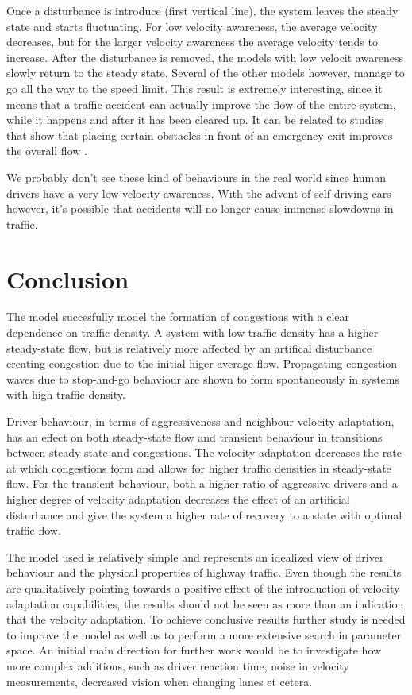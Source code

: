 \documentclass[11pt,a4paper,twocolumn]{article}
\begin{document}
Once a disturbance is introduce (first vertical line), the system leaves the steady state and starts fluctuating. For low velocity awareness, the average velocity decreases, but for the larger velocity awareness the average velocity tends to increase.
After the disturbance is removed, the models with low velocit awareness slowly return to the steady state. Several of the other models however, manage to go all the way to the speed limit.
This result is extremely interesting, since it means that a traffic accident can actually improve the flow of the entire system, while it happens and after it has been cleared up.
It can be related to studies that show that placing certain obstacles in front of an emergency exit improves the overall flow \cite{yanagisawa2009obstacle}.

We probably don't see these kind of behaviours in the real world since human drivers have a very low velocity awareness. With the advent of self driving cars however, it's possible that accidents will no longer cause immense slowdowns in traffic.

\section{Conclusion}
The model succesfully model the formation of congestions with a clear dependence on traffic density. A system with low traffic density has a higher steady-state flow, but is relatively more affected by an artifical disturbance creating congestion due to the initial higer average flow. Propagating congestion waves due to stop-and-go behaviour are shown to form spontaneously in systems with high traffic density. 

Driver behaviour, in terms of aggressiveness and neighbour-velocity adaptation, has an effect on both steady-state flow and transient behaviour in transitions between steady-state and congestions. The velocity adaptation decreases the rate at which congestions form and allows for higher traffic densities in steady-state flow. For the transient behaviour, both a higher ratio of aggressive drivers and a higher degree of velocity adaptation decreases the effect of an artificial disturbance and give the system a higher rate of recovery to a state with optimal traffic flow.

The model used is relatively simple and represents an idealized view of driver behaviour and the physical properties of highway traffic. Even though the results are qualitatively pointing towards a positive effect of the introduction of velocity adaptation capabilities, the results should not be seen as more than an indication that the velocity adaptation. To achieve conclusive results further study is needed to improve the model as well as to perform a more extensive search in parameter space. An initial main direction for further work would be to investigate how more complex additions, such as driver reaction time, noise in velocity measurements, decreased vision when changing lanes et cetera.
\end{document}
